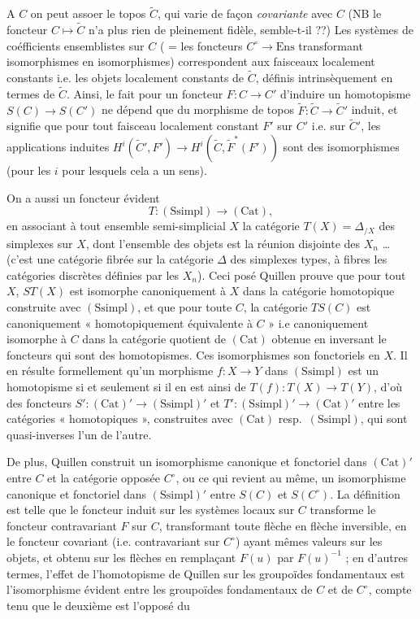 \documentclass[11pt,a4paper]{article}
\begin{document}
A $C$ on peut assoer le topos $\widetilde{C}$, qui varie de façon
\emph{covariante} avec $C$ (NB le foncteur $C \mapsto \widetilde{C}$ n'a plus
rien de pleinement fidèle, semble-t-il ??) Les systèmes de coéfficients
ensemblistes sur $C$ ( = les foncteurs $C^{\circ} \to \mathrm{Ens}$
transformant isomorphismes en isomorphismes) correspondent aux faisceaux
localement constants i.e. les objets localement constants de $\widetilde{C}$,
définis intrinsèquement en termes de $\widetilde{C}$. Ainsi, le fait pour un
foncteur $F : C \to C'$ d'induire un homotopisme $S(C) \to S(C')$ ne dépend que
du morphisme de topos $\widetilde{F} : \widetilde{C} \to \widetilde{C}'$
induit, et signifie que pour tout faisceau localement constant $F'$ sur $C'$
i.e. sur $\widetilde{C}'$, les applications induites
$H^{i}(\widetilde{C}', F') \to H^{i}(\widetilde{C}, \widetilde{F}^{*}(F'))$
sont des isomorphismes (pour les $i$ pour lesquels cela a un sens).

On a aussi un foncteur évident
\[
T : (\mathrm{Ssimpl}) \longrightarrow (\mathrm{Cat}) ,
\]
en associant à tout ensemble semi-simplicial $X$ la catégorie
$T(X) = \Delta_{/X}$ des simplexes sur $X$, dont l'ensemble des objets est la
réunion disjointe des $X_{n}$ … (c'est une catégorie fibrée sur la
catégorie $\Delta$ des simplexes types, à fibres les catégories discrètes
définies par les $X_{n}$). Ceci posé Quillen prouve que pour tout $X$, $ST(X)$
est isomorphe canoniquement à $X$ dans la catégorie homotopique construite avec
$(\mathrm{Ssimpl})$, et que pour toute $C$, la catégorie $TS(C)$ est
canoniquement « homotopiquement équivalente à $C$ » i.e canoniquement
isomorphe à $C$ dans la catégorie quotient de $(\mathrm{Cat})$ obtenue en
inversant le foncteurs qui sont des homotopismes. Ces isomorphismes
son fonctoriels en $X$. Il en résulte formellement qu'un morphisme
$f : X \to Y$ dans $(\mathrm{Ssimpl})$ est un homotopisme si et seulement si il
en est ainsi de $T(f) : T(X) \to T(Y)$, d'où des foncteurs
$S' : (\mathrm{Cat})' \to (\mathrm{Ssimpl})'$ et
$T' : (\mathrm{Ssimpl})' \to (\mathrm{Cat})'$ entre les catégories
« homotopiques », construites avec $(\mathrm{Cat})$ resp.\ $(\mathrm{Ssimpl})$,
qui sont quasi-inverses l'un de l'autre.

De plus, Quillen construit un isomorphisme canonique et fonctoriel dans
$(\mathrm{Cat})'$ entre $C$ et la catégorie opposée $C^{\circ}$, ou ce qui
revient au même, un isomorphisme canonique et fonctoriel dans
$(\mathrm{Ssimpl})'$ entre $S(C)$ et $S(C^{\circ})$. La définition est telle
que le foncteur induit sur les systèmes locaux sur $C$ transforme le foncteur
contravariant $F$ sur $C$, transformant toute flèche en flèche inversible, en
le foncteur covariant (i.e. contravariant sur $C^{\circ}$) ayant mêmes valeurs
sur les objets, et obtenu sur les flèches en remplaçant $F(u)$ par
$F(u)^{-1}$ ; en d'autres termes, l'effet de l'homotopisme de Quillen sur les
groupoïdes fondamentaux est l'isomorphisme évident entre les groupoïdes
fondamentaux de $C$ et de $C^{\circ}$, compte tenu que le deuxième est
l'opposé du
\end{document}
